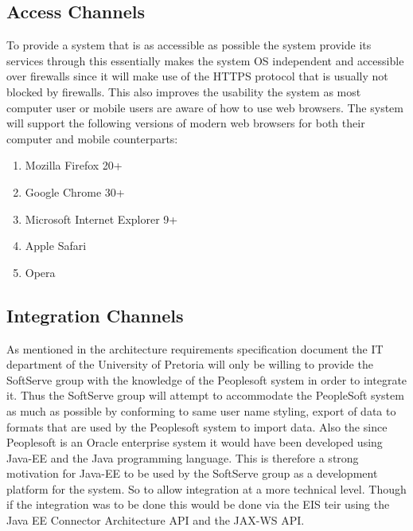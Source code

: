 \documentclass[12pt]{article}
\begin{document}
\subsection{Access Channels}
To provide a system that is as accessible as possible the system provide its services through this essentially makes the system OS independent and accessible over firewalls since it will make use of the HTTPS protocol that is usually not blocked by firewalls. This also improves the usability the system as most computer user or mobile users are aware of how to use web browsers. The system will support the following versions of modern web browsers for both their computer and mobile counterparts:
\begin{enumerate}
\item Mozilla Firefox 20+
\item Google Chrome 30+
\item Microsoft Internet Explorer 9+
\item Apple Safari
\item Opera
\end{enumerate}

\subsection{Integration Channels}
As mentioned in the architecture requirements specification document the IT department of the University of Pretoria will only be willing to provide the SoftServe group with the knowledge of the Peoplesoft system in order to integrate it. Thus the SoftServe group will attempt to accommodate the PeopleSoft system as much as possible by conforming to same user name styling, export of data to formats that are used by the Peoplesoft system to import data. Also the since Peoplesoft is an Oracle enterprise system it would have been developed using Java-EE and the Java programming language. This is therefore a strong motivation for Java-EE to be used by the SoftServe group as a development platform for the system. So to allow integration at a more technical level. Though if the integration was to be done this would be done via the EIS teir using the Java EE Connector Architecture API and the JAX-WS API.  


\end{document}
